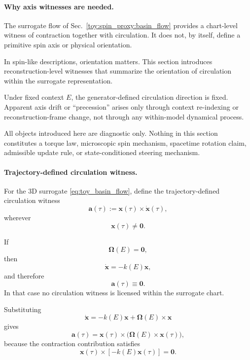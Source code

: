 \documentclass[aps,prx,onecolumn,11pt]{revtex4-2}
\theoremstyle{plain}
\theoremstyle{definition}
\theoremstyle{remark}
\begin{document}
\paragraph{Why axis witnesses are needed.}

The surrogate flow of
Sec.~\ref{toy:spin_proxy:basin_flow}
provides a chart-level witness of contraction together with circulation.
It does not, by itself, define a primitive spin axis or physical
orientation.

In spin-like descriptions, orientation matters. This section introduces
reconstruction-level witnesses that summarize the orientation of
circulation within the surrogate representation.

Under fixed context \(E\), the generator-defined circulation direction
is fixed. Apparent axis drift or ``precession'' arises only through
context re-indexing or reconstruction-frame change, not through any
within-model dynamical process.

All objects introduced here are diagnostic only. Nothing in this
section constitutes a torque law, microscopic spin mechanism, spacetime
rotation claim, admissible update rule, or state-conditioned steering
mechanism.

\paragraph{Trajectory-defined circulation witness.}

For the 3D surrogate
\eqref{eq:toy_basin_flow},
define the trajectory-defined circulation witness
\begin{equation}
\mathbf a(\tau)
:=
\mathbf x(\tau)
\times
\dot{\mathbf x}(\tau),
\label{eq:toy_axis_proxy}
\end{equation}
wherever
\[
\mathbf x(\tau)\neq \mathbf 0.
\]

If
\[
\boldsymbol{\Omega}(E)=\mathbf 0,
\]
then
\[
\dot{\mathbf x}
=
-k(E)\mathbf x,
\]
and therefore
\[
\mathbf a(\tau)\equiv \mathbf 0.
\]
In that case no circulation witness is licensed within the surrogate
chart.

Substituting
\[
\dot{\mathbf x}
=
-k(E)\mathbf x
+
\boldsymbol{\Omega}(E)\times\mathbf x
\]
gives
\begin{equation}
\mathbf a(\tau)
=
\mathbf x(\tau)
\times
\bigl(
\boldsymbol{\Omega}(E)
\times
\mathbf x(\tau)
\bigr),
\label{eq:toy_axis_proxy_triple}
\end{equation}
because the contraction contribution satisfies
\[
\mathbf x(\tau)\times[-k(E)\mathbf x(\tau)]
=
\mathbf 0.
\]
\end{document}
